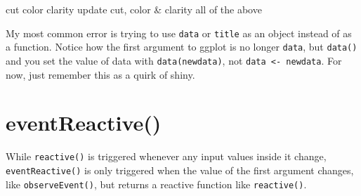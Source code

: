 \documentclass[
]{book}
\newenvironment{Shaded}{\begin{snugshade}}{\end{snugshade}}
\newcommand{\AttributeTok}[1]{\textcolor[rgb]{0.77,0.63,0.00}{#1}}
\newcommand{\ControlFlowTok}[1]{\textcolor[rgb]{0.13,0.29,0.53}{\textbf{#1}}}
\newcommand{\FloatTok}[1]{\textcolor[rgb]{0.00,0.00,0.81}{#1}}
\newcommand{\FunctionTok}[1]{\textcolor[rgb]{0.00,0.00,0.00}{#1}}
\newcommand{\NormalTok}[1]{#1}
\newcommand{\OtherTok}[1]{\textcolor[rgb]{0.56,0.35,0.01}{#1}}
\newcommand{\SpecialCharTok}[1]{\textcolor[rgb]{0.00,0.00,0.00}{#1}}
\newcommand{\StringTok}[1]{\textcolor[rgb]{0.31,0.60,0.02}{#1}}
\begin{document}
cut color clarity update cut, color \& clarity all of the above

My most common error is trying to use \texttt{data} or \texttt{title} as an object instead of as a function. Notice how the first argument to ggplot is no longer \texttt{data}, but \texttt{data()} and you set the value of data with \texttt{data(newdata)}, not \texttt{data\ \textless{}-\ newdata}. For now, just remember this as a quirk of shiny.

\hypertarget{eventreactive}{%
\section{eventReactive()}\label{eventreactive}}

While \texttt{reactive()} is triggered whenever any input values inside it change, \texttt{eventReactive()} is only triggered when the value of the first argument changes, like \texttt{observeEvent()}, but returns a reactive function like \texttt{reactive()}.

\begin{Shaded}
\end{Shaded}
\end{document}
